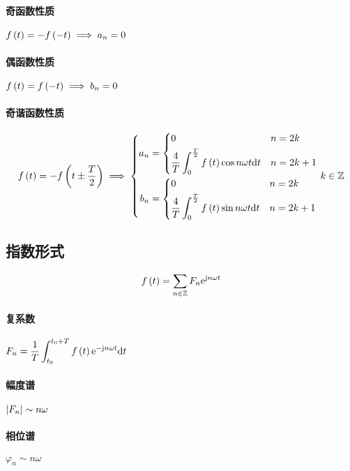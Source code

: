 \documentclass{article}
\begin{document}
\paragraph{奇函数性质}$f\left(t\right)=-f\left(-t\right)\implies a_n=0$

\paragraph{偶函数性质}$f\left(t\right)=f\left(-t\right)\implies b_n=0$

\paragraph{奇谐函数性质}

\[f\left(t\right)=-f\left(t\pm\frac T2\right)
    \implies\left\{\begin{aligned}
        a_n & =
        \left\{\begin{aligned}
                    & 0                                             &  & n=2k   \\
                    & \frac4T\int_0^{\frac T2}f\left(t\right)\cos n\omega t\mathrm d t &  & n=2k+1
               \end{aligned}\right. \\
        b_n & =
        \left\{\begin{aligned}
                    & 0                                             &  & n=2k   \\
                    & \frac4T\int_0^{\frac T2}f\left(t\right)\sin n\omega t\mathrm d t &  & n=2k+1
               \end{aligned}\right.
    \end{aligned}\right.k\in\mathbb Z\]

\subsection{指数形式}

\[f\left(t\right)=\sum_{n\in\mathbb Z} F_n\mathrm e^{\mathrm j n\omega t}\]

\paragraph{复系数}$\displaystyle F_n=\frac1T\int_{t_0}^{t_0+T}f\left(t\right)\mathrm e^{-\mathrm j n\omega t}\mathrm d t$

\paragraph{幅度谱}$\left|F_n\right|\sim n\omega$

\paragraph{相位谱}$\varphi_n\sim n\omega$
\end{document}
